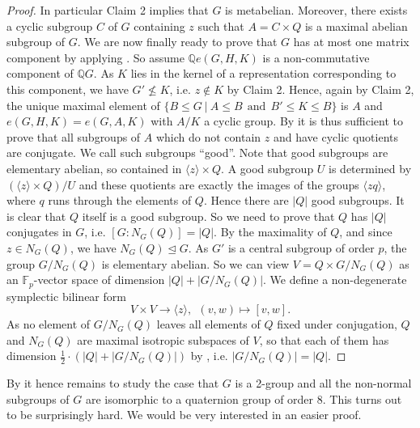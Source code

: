 \documentclass[a4paper,10pt]{amsart}
\theoremstyle{definition}
\theoremstyle{remark}
\begin{document}
\begin{proof}
In particular Claim 2 implies that $G$ is metabelian. Moreover, there exists a cyclic subgroup $C$ of $G$ containing $z$ such that $A = C \times Q$ is a maximal abelian subgroup of $G$. We are now finally ready to prove that $G$ has at most one matrix component by applying . So assume $\mathbb{Q}e(G,H,K)$ is a non-commutative component of $\mathbb{Q}G$. As $K$ lies in the kernel of a representation corresponding to this component, we have $G' \not\leq K$, i.e. $z \notin K$ by Claim 2. Hence, again by Claim 2, the unique maximal element of $\{B \leq G \ | \ A\leq B \ \ \text{and} \ \ B' \leq K \leq B \}$ is $A$ and $e(G,H,K) = e(G,A,K)$ with $A/K$ a cyclic group. By  it is thus sufficient to prove that all subgroups of $A$ which do not contain $z$ and have cyclic quotients are conjugate. We call such subgroups ``good''. Note that good subgroups are elementary abelian, so contained in $\langle z \rangle \times Q$. A good subgroup $U$ is determined by $(\langle z \rangle \times Q)/U$ and these quotients are exactly the images of the groups $\langle z q\rangle$, where $q$ runs through the elements of $Q$. Hence there are $|Q|$ good subgroups. It is clear that $Q$ itself is a good subgroup. So we need to prove that $Q$ has $|Q|$ conjugates in $G$, i.e. $[G:N_G(Q)] = |Q|$. By the maximality of $Q$, and since $z \in N_G(Q)$, we have $N_G(Q) \unlhd G$. As $G'$ is a central subgroup of order $p$, the group $G/N_G(Q)$ is elementary abelian. So we can view $V = Q \times G/N_G(Q)$ as an $\mathbb{F}_p$-vector space of dimension $|Q| + |G/N_G(Q)|$. We define a non-degenerate symplectic bilinear form
\[V \times V \rightarrow \langle z \rangle, \ \ (v,w) \mapsto [v,w]. \]
As no element of $G/N_G(Q)$ leaves all elements of $Q$ fixed under conjugation, $Q$ and $N_G(Q)$ are maximal isotropic subspaces of $V$, so that each of them has dimension $\frac{1}{2}\cdot(|Q| + |G/N_G(Q)|)$ by \cite[II, Satz 9.11]{Huppert}, i.e. $|G/N_G(Q)| = |Q|$. 
\end{proof}

By  it hence remains to study the case that $G$ is a 2-group and all the non-normal subgroups of $G$ are isomorphic to a quaternion group of order $8$. This turns out to be surprisingly hard. We would be very interested in an easier proof.
\end{document}
